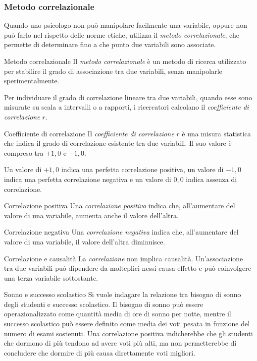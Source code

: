 \documentclass[a4paper]{article}
\begin{document}
\subsubsection{Metodo correlazionale}
Quando uno psicologo non può manipolare facilmente una variabile, oppure non può farlo nel rispetto delle norme etiche, utilizza il \emph{metodo correlazionale}, che permette di determinare fino a che punto due variabili sono associate.
\begin{snippetdefinition}{Metodo correlazionale}
    Il \emph{metodo correlazionale} è un metodo di ricerca utilizzato per stabilire il grado di associazione tra due variabili, senza manipolarle sperimentalmente.
\end{snippetdefinition}
Per individuare il grado di correlazione lineare tra due variabili, quando esse sono misurate su scala a intervalli o a rapporti, i ricercatori calcolano il \emph{coefficiente di correlazione} \(r\).
\begin{snippetdefinition}{Coefficiente di correlazione}
    Il \emph{coefficiente di correlazione} \(r\) è una misura statistica che indica il grado di correlazione esistente tra due variabili. Il suo valore è compreso tra \(+1{,}0\) e \(-1{,}0\).
\end{snippetdefinition}
Un valore di \(+1{,}0\) indica una perfetta correlazione positiva, un valore di \(-1{,}0\) indica una perfetta correlazione negativa e un valore di \(0{,}0\) indica assenza di correlazione.
\begin{snippetdefinition}{Correlazione positiva}
    Una \emph{correlazione positiva} indica che, all'aumentare del valore di una variabile, aumenta anche il valore dell'altra.
\end{snippetdefinition}
\begin{snippetdefinition}{Correlazione negativa}
    Una \emph{correlazione negativa} indica che, all'aumentare del valore di una variabile, il valore dell'altra diminuisce.
\end{snippetdefinition}
\begin{snippetnote}{Correlazione e causalità}
    La \emph{correlazione} non implica causalità. Un'associazione tra due variabili può dipendere da molteplici nessi causa-effetto e può coinvolgere una terza variabile sottostante.
\end{snippetnote}
\begin{snippetexample}{Sonno e successo scolastico}
    Si vuole indagare la relazione tra bisogno di sonno degli studenti e successo scolastico. Il bisogno di sonno può essere operazionalizzato come quantità media di ore di sonno per notte, mentre il successo scolastico può essere definito come media dei voti pesata in funzione del numero di esami sostenuti. Una correlazione positiva indicherebbe che gli studenti che dormono di più tendono ad avere voti più alti, ma non permetterebbe di concludere che dormire di più causa direttamente voti migliori.
\end{snippetexample}
\end{document}

